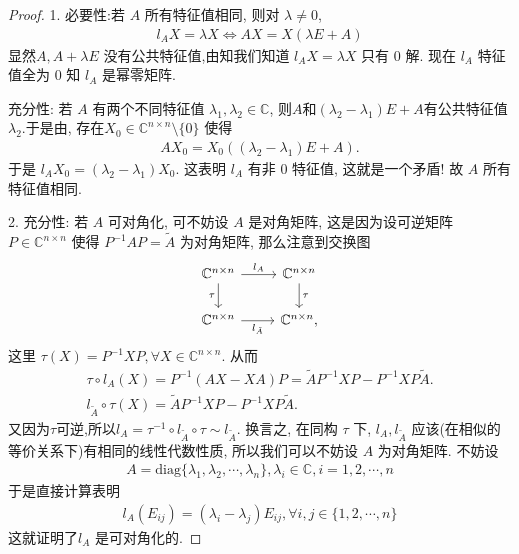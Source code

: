 \documentclass[../../main.tex]{subfiles}%
\begin{document}
\begin{proof}
1. {\heiti 必要性:}若 $A$ 所有特征值相同, 则对 $\lambda \neq 0$,
\begin{align*}
l_A X = \lambda X \Leftrightarrow AX = X(\lambda E + A)
\end{align*}
显然$A, A + \lambda E$ 没有公共特征值,由知我们知道 $l_A X = \lambda X$ 只有 $0$ 解. 现在 $l_A$ 特征值全为 $0$ 知 $l_A$ 是幂零矩阵.

{\heiti 充分性:} 若 $A$ 有两个不同特征值 $\lambda_1, \lambda_2 \in \mathbb{C}$, 则$A$和$(\lambda_2-\lambda_1)E+A$有公共特征值$\lambda_2$.于是由, 存在$X_0 \in \mathbb{C}^{n \times n} \setminus \{0\}$ 使得
\begin{align*}
A X_0 = X_0((\lambda_2 - \lambda_1)E + A).
\end{align*}
于是 $l_A X_0 = (\lambda_2 - \lambda_1) X_0$. 这表明 $l_A$ 有非 $0$ 特征值, 这就是一个矛盾! 故 $A$ 所有特征值相同.

2. {\heiti 充分性:} 若 $A$ 可对角化, 可不妨设 $A$ 是对角矩阵, 这是因为设可逆矩阵 $P \in \mathbb{C}^{n \times n}$ 使得 $P^{-1} A P = \tilde{A}$ 为对角矩阵, 那么注意到交换图
\[
\begin{tikzcd}
\mathbb{C}^{n\times n} \arrow[d, "\tau"'] \arrow[r, "l_A"] & \mathbb{C}^{n\times n} \arrow[d, "\tau"] \\
\mathbb{C}^{n\times n} \arrow[r, "l_{\tilde{A}}"']                   & \mathbb{C}^{n\times n},                  
\end{tikzcd}
\]
这里 $\tau(X) = P^{-1} X P, \forall X \in \mathbb{C}^{n \times n}$. 从而
\begin{gather*}
\tau \circ l_A\left( X \right) =P^{-1}\left( AX-XA \right) P=\widetilde{A}P^{-1}XP-P^{-1}XP\widetilde{A}.
\\
l_{\widetilde{A}}\circ \tau \left( X \right) =\widetilde{A}P^{-1}XP-P^{-1}XP\widetilde{A}.
\end{gather*}
又因为$\tau$可逆,所以$l_A=\tau ^{-1} \circ l_{\tilde{A}}\circ \tau \sim l_{\tilde{A}}.$
换言之, 在同构 $\tau$ 下, $l_A, l_{\tilde{A}}$ 应该(在相似的等价关系下)有相同的线性代数性质, 所以我们可以不妨设 $A$ 为对角矩阵.
不妨设
\begin{align*}
A = \mathrm{diag}\{\lambda_1, \lambda_2, \cdots, \lambda_n\}, \lambda_i \in \mathbb{C}, i = 1, 2, \cdots, n 
\end{align*}
于是直接计算表明
\begin{align*}
l_A(E_{ij}) = (\lambda_i - \lambda_j) E_{ij}, \forall i, j \in \{1, 2, \cdots, n\}
\end{align*}
这就证明了$l_A$ 是可对角化的.


\end{proof}
\end{document}
